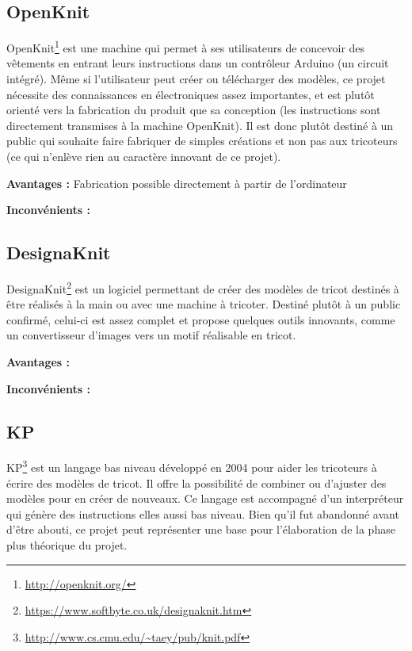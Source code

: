 \documentclass{article}
\begin{document}
\subsection{OpenKnit}

OpenKnit\footnote{\url{http://openknit.org/}} est une machine qui permet à ses utilisateurs de concevoir des vêtements en entrant leurs 
instructions dans un contrôleur Arduino (un circuit intégré). Même si l'utilisateur peut créer ou télécharger des modèles, ce projet 
nécessite des connaissances en électroniques assez importantes, et est plutôt orienté vers la fabrication du produit que sa conception 
(les instructions sont directement transmises à la machine OpenKnit). Il est donc plutôt destiné à un public qui souhaite faire fabriquer 
de simples créations et non pas aux tricoteurs (ce qui n'enlève rien au caractère innovant de ce projet).

\textbf{Avantages : } Fabrication possible directement à partir de l'ordinateur

\textbf{Inconvénients : } %

\subsection{DesignaKnit}

DesignaKnit\footnote{\url{https://www.softbyte.co.uk/designaknit.htm}} est un logiciel permettant de créer des modèles de tricot destinés 
à être réalisés à la main ou avec une machine à tricoter. Destiné plutôt à un public confirmé, celui-ci est assez complet et propose 
quelques outils innovants, comme un convertisseur d'images vers un motif réalisable en tricot.

\textbf{Avantages : } %

\textbf{Inconvénients : } %

\subsection{KP}

KP\footnote{\url{http://www.cs.cmu.edu/~taey/pub/knit.pdf}} est un langage bas niveau développé en 2004 pour aider les tricoteurs à écrire 
des modèles de tricot. Il offre la possibilité de combiner ou d'ajuster des modèles pour en créer de nouveaux. Ce langage est accompagné 
d'un interpréteur qui génère des instructions elles aussi bas niveau. Bien qu'il fut abandonné avant d'être abouti, ce projet peut 
représenter une base pour l'élaboration de la phase plus théorique du projet.
\end{document}
